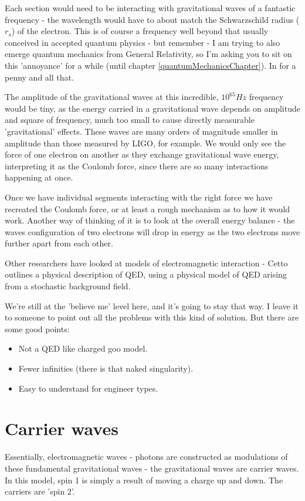 \documentclass[../rzero]{subfiles}
\begin{document}
 Each section would need to be interacting with gravitational waves of a fantastic frequency - the wavelength would have to about match the Schwarzschild radius ($r_s$) of the electron. This is of course a frequency well beyond that usually conceived in accepted quantum physics - but remember - I am trying to also emerge quantum mechanics from General Relativity, so I'm asking you to sit on this 'annoyance' for a while (until chapter \ref{quantumMechanicsChapter}).  In for a penny and all that.
 
 The amplitude of the gravitational waves at this incredible, $10^{65} Hz$ frequency would be tiny, as the energy carried in a gravitational wave depends on  amplitude and square of frequency, much too small to cause directly measurable 'gravitational' effects. These waves are  many orders of magnitude smaller in amplitude than those measured by LIGO, for example. We would only see the force of one electron on another as they exchange gravitational wave energy, interpreting it as the Coulomb force, since there are so many interactions happening at once. 
 
 Once we have individual segments interacting with the right force we have recreated the Coulomb force, or at least a rough mechanism as to how it would work. Another way of thinking of it is to look at the overall energy balance - the waves configuration of two electrons will drop in energy as the two electrons move further apart from each other. 
 
 
 Other researchers have looked at models of electromagnetic interaction - Cetto\cite{Cetto2013} outlines a physical description of QED, using a physical model of QED arising from a stochastic background field. 
 
 We're still at the 'believe me' level here, and it's going to stay that way. I leave it to someone to point out all the problems with this kind of solution. But there are some good points:
 
 \begin{itemize}
 	\item Not a QED like charged goo model.
 	\item Fewer infinities (there is that naked singularity).
 	\item Easy to understand for engineer types.
 \end{itemize} 

 
 \section{Carrier waves} 
 Essentially, electromagnetic waves - photons are constructed as modulations of these fundamental gravitational waves - the gravitational waves are carrier waves. In this model, spin 1 is simply a result of moving a charge up and down. The carriers are 'spin 2'.
 
\end{document}
